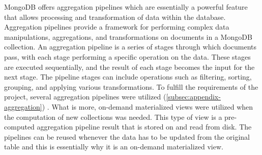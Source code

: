 \documentclass{article}
\begin{document}
    MongoDB offers aggregation pipelines which are essentially a powerful feature that allows processing and transformation of data within the database. Aggregation pipelines provide a framework for performing complex data manipulations, aggregations, and transformations on documents in a MongoDB collection. An aggregation pipeline is a series of stages through which documents pass, with each stage performing a specific operation on the data. These stages are executed sequentially, and the result of each stage becomes the input for the next stage. The pipeline stages can include operations such as filtering, sorting, grouping, and applying various transformations. To fulfill the requirements of the project, several aggregation pipelines were utilized (\ref{subsec:appendix-aggregation}) . What is more, on-demand materialized views were utilized when the computation of new collections was needed. This type of view is a pre-computed aggregation pipeline result that is stored on and read from disk. The pipelines can be reused whenever the data has to be updated from the original table and this is essentially why it is an on-demand materialized view.  
\end{document}
